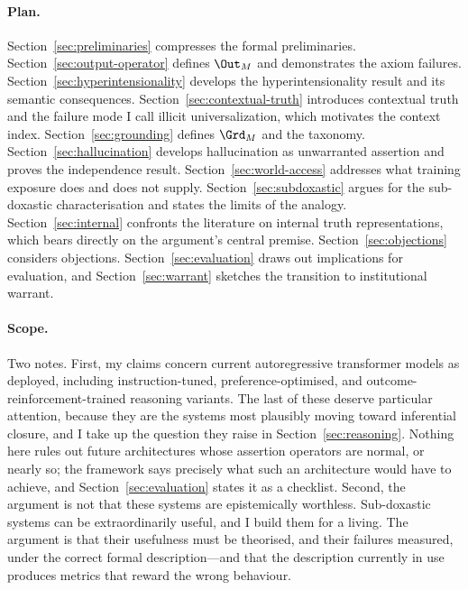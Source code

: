 \paragraph{Plan.} Section~\ref{sec:preliminaries} compresses the formal
preliminaries. Section~\ref{sec:output-operator} defines $\Out_M$ and
demonstrates the axiom failures. Section~\ref{sec:hyperintensionality} develops
the hyperintensionality result and its semantic consequences.
Section~\ref{sec:contextual-truth} introduces contextual truth and the failure
mode I call illicit universalization, which motivates the context index.
Section~\ref{sec:grounding} defines $\Grd_M$ and the taxonomy.
Section~\ref{sec:hallucination} develops hallucination as unwarranted assertion
and proves the independence result. Section~\ref{sec:world-access} addresses
what training exposure does and does not supply.
Section~\ref{sec:subdoxastic} argues for the sub-doxastic characterisation and
states the limits of the analogy. Section~\ref{sec:internal} confronts the
literature on internal truth representations, which bears directly on the
argument's central premise. Section~\ref{sec:objections} considers objections.
Section~\ref{sec:evaluation} draws out implications for evaluation, and
Section~\ref{sec:warrant} sketches the transition to institutional warrant.

\paragraph{Scope.} Two notes. First, my claims concern current autoregressive
transformer models as deployed, including instruction-tuned, preference-optimised,
and outcome-reinforcement-trained reasoning variants. The last of these deserve
particular attention, because they are the systems most plausibly moving toward
inferential closure, and I take up the question they raise in
Section~\ref{sec:reasoning}. Nothing here rules out future architectures whose
assertion operators are normal, or nearly so; the framework says precisely what
such an architecture would have to achieve, and
Section~\ref{sec:evaluation} states it as a checklist. Second, the argument is
not that these systems are epistemically worthless. Sub-doxastic systems can be
extraordinarily useful, and I build them for a living. The argument is that
their usefulness must be theorised, and their failures measured, under the
correct formal description---and that the description currently in use produces
metrics that reward the wrong behaviour.
